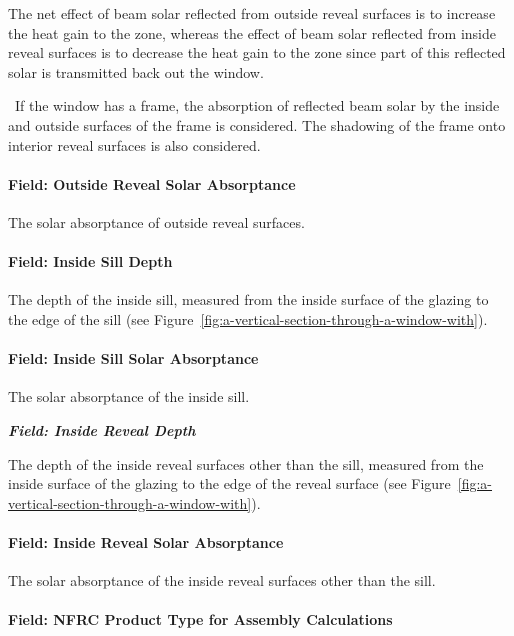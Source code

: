 The net effect of beam solar reflected from outside reveal surfaces is to increase the heat gain to the zone, whereas the effect of beam solar reflected from inside reveal surfaces is to decrease the heat gain to the zone since part of this reflected solar is transmitted back out the window.

~If the window has a frame, the absorption of reflected beam solar by the inside and outside surfaces of the frame is considered. The shadowing of the frame onto interior reveal surfaces is also considered.

\paragraph{Field: Outside Reveal Solar Absorptance}\label{field-outside-reveal-solar-absorptance}

The solar absorptance of outside reveal surfaces.

\paragraph{Field: Inside Sill Depth}\label{field-inside-sill-depth}

The depth of the inside sill, measured from the inside surface of the glazing to the edge of the sill (see Figure~\ref{fig:a-vertical-section-through-a-window-with}).

\paragraph{Field: Inside Sill Solar Absorptance}\label{field-inside-sill-solar-absorptance}

The solar absorptance of the inside sill.

\textbf{\emph{Field: Inside Reveal Depth}}

The depth of the inside reveal surfaces other than the sill, measured from the inside surface of the glazing to the edge of the reveal surface (see Figure~\ref{fig:a-vertical-section-through-a-window-with}).

\paragraph{Field: Inside Reveal Solar Absorptance}\label{field-inside-reveal-solar-absorptance}

The solar absorptance of the inside reveal surfaces other than the sill.

\paragraph{Field: NFRC Product Type for Assembly Calculations}\label{field-nfrc-product-type-for-assembly-calculations}

